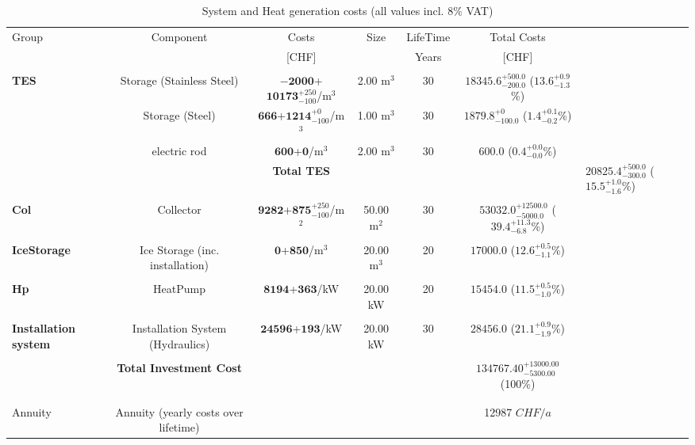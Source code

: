 \documentclass[english]{SPFShortReport}
\begin{document}
\begin{table}[!ht]
\centering
\caption{System and Heat generation costs (all values incl. 8$\%$ VAT) }
\begin{adjustbox}{max width =\textwidth}
\begin{tabular}{l | c c c c c } 
\hline
\hline
Group &Component &Costs &Size &LifeTime &Total Costs \\ 
 & &[CHF] & &Years &[CHF]\\ 
\hline
\\
\textbf{TES} & Storage (Stainless Steel) & $\mathbf{-2000}$+$\mathbf{10173}^{+250}_{-100}$/m$^3$ & 2.00 m$^3$ & 30 & $\mathbf{18345.6}^{+500.0}_{-200.0}$ ($\mathbf{13.6}^{+0.9}_{-1.3}$\%) \\
 & Storage (Steel) & $\mathbf{666}$+$\mathbf{1214}^{+0}_{-100}$/m$^3$ & 1.00 m$^3$ & 30 & $\mathbf{1879.8}^{+0}_{-100.0}$ ($\mathbf{1.4}^{+0.1}_{-0.2}$\%) \\
 & electric rod & $\mathbf{600}$+$\mathbf{0}$/m$^3$ & 2.00 m$^3$ & 30 & $\mathbf{600.0}$ ($\mathbf{0.4}^{+0.0}_{-0.0}$\%) \\
&
 & \textbf{Total TES} & & & & $\mathbf{20825.4}^{+500.0}_{-300.0}$ ($\mathbf{15.5}^{+1.0}_{-1.6}$\%) \\
\hline \\
\textbf{Col} & Collector & $\mathbf{9282}$+$\mathbf{875}^{+250}_{-100}$/m$^2$ & 50.00 m$^2$ & 30 & $\mathbf{53032.0}^{+12500.0}_{-5000.0}$ ($\mathbf{39.4}^{+11.3}_{-6.8}$\%) \\
\hline \\
\textbf{IceStorage} & Ice Storage (inc. installation) & $\mathbf{0}$+$\mathbf{850}$/m$^3$ & 20.00 m$^3$ & 20 & $\mathbf{17000.0}$ ($\mathbf{12.6}^{+0.5}_{-1.1}$\%) \\
\hline \\
\textbf{Hp} & HeatPump & $\mathbf{8194}$+$\mathbf{363}$/kW & 20.00 kW & 20 & $\mathbf{15454.0}$ ($\mathbf{11.5}^{+0.5}_{-1.0}$\%) \\
\hline \\
\textbf{Installation system} & Installation System (Hydraulics) & $\mathbf{24596}$+$\mathbf{193}$/kW & 20.00 kW & 30 & $\mathbf{28456.0}$ ($\mathbf{21.1}^{+0.9}_{-1.9}$\%) \\
\hline \\
 & \textbf{Total Investment Cost} & & & & \textbf{$\mathbf{134767.40}^{+13000.00}_{-5300.00}$} (100\%) \\ 
\hline \\ 
\hline \\ 
Annuity & Annuity (yearly costs over lifetime)  &&& & 12987 $CHF/a$  \\

\end{tabular}
\end{adjustbox}
\end{table}
\end{document}
